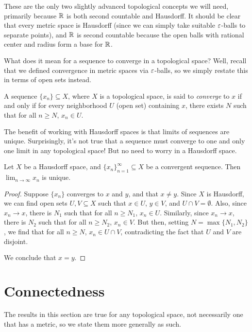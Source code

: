 These are the only two slightly advanced topological concepts we will need, primarily because $\mathbb R$ is both second countable and Hausdorff. It should be clear that every metric space is Hausdorff (since we can simply take suitable $\varepsilon$-balls to separate points), and $\mathbb R$ is second countable because the open balls with rational center and radius form a base for $\mathbb R$.

What does it mean for a sequence to converge in a topological space? Well, recall that we defined convergence in metric spaces via $\varepsilon$-balls, so we simply restate this in terms of open sets instead.

\begin{definition}
	A sequence $\{x_n\} \subseteq X$, where $X$ is a topological space, is said to \emph{converge} to $x$ if and only if for every neighborhood $U$ (open set) containing $x$, there exists $N$ such that for all $n \ge N$, $x_n \in U$.
\end{definition}

The benefit of working with Hausdorff spaces is that limits of sequences are unique. Surprisingly, it's not true that a sequence must converge to one and only one limit in any topological space! But no need to worry in a Hausdorff space.

\begin{proposition}
	Let $X$ be a Hausdorff space, and $\{x_n\}_{n=1}^{\infty} \subseteq X$ be a convergent sequence. Then $\lim_{n \rightarrow \infty} x_n$ is unique.
\end{proposition}
\begin{proof}
	Suppose $\{x_n\}$ converges to $x$ and $y$, and that $x \neq y$. Since $X$ is Hausdorff, we can find open sets $U,V \subseteq X$ such that $x \in U$, $y \in V$, and $U \cap V=\emptyset$. Also, since $x_n \rightarrow x$, there is $N_1$ such that for all $n \ge N_1$, $x_n \in U$. Similarly, since $x_n \rightarrow x$, there is $N_2$ such that for all $n \ge N_2$, $x_n \in V$. But then, setting $N=\max\{N_1,N_2\}$, we find that for all $n \ge N$, $x_n \in U \cap V$, contradicting the fact that $U$ and $V$ are disjoint.
	
	We conclude that $x=y$.
\end{proof}

\section{Connectedness}
The results in this section are true for any topological space, not necessarily one that has a metric, so we state them more generally as such.

